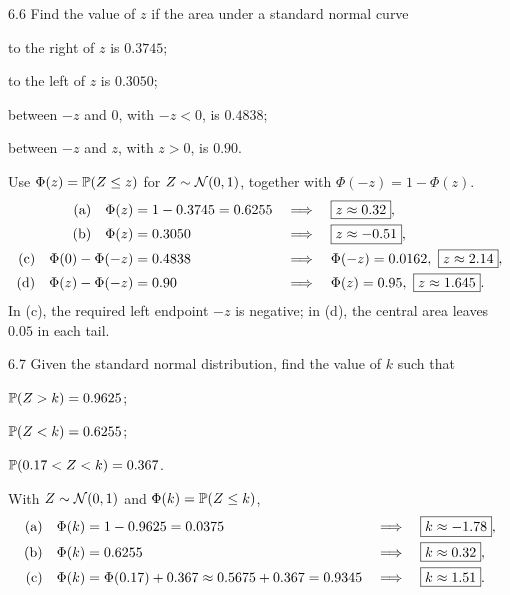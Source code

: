 \documentclass[11pt,oneside]{article}
\begin{document}
\begin{exercise}{6.6}
Find the value of $z$ if the area under a standard normal curve
\begin{exercisesubparts}
\item to the right of $z$ is $0.3745$;
\item to the left of $z$ is $0.3050$;
\item between $-z$ and $0$, with $-z<0$, is $0.4838$;
\item between $-z$ and $z$, with $z>0$, is $0.90$.
\end{exercisesubparts}
\end{exercise}
\begin{solution}
Use $\Phi(z)=\mathbb{P}(Z\le z)$ for $Z\sim\mathcal{N}(0,1)$, together with $\Phi(-z)=1-\Phi(z)$.
\begin{align*}
\textup{(a)}\quad\Phi(z)&=1-0.3745=0.6255
 &&\Longrightarrow\quad\boxed{z\approx0.32},\\
\textup{(b)}\quad\Phi(z)&=0.3050
 &&\Longrightarrow\quad\boxed{z\approx-0.51},\\
\textup{(c)}\quad\Phi(0)-\Phi(-z)&=0.4838
 &&\Longrightarrow\quad\Phi(-z)=0.0162,\ \boxed{z\approx2.14},\\
\textup{(d)}\quad\Phi(z)-\Phi(-z)&=0.90
 &&\Longrightarrow\quad\Phi(z)=0.95,\ \boxed{z\approx1.645}.
\end{align*}
In (c), the required left endpoint $-z$ is negative; in (d), the central area leaves $0.05$ in each tail.
\end{solution}

\begin{exercise}{6.7}
Given the standard normal distribution, find the value of $k$ such that
\begin{exercisesubparts}
\item $\mathbb{P}(Z>k)=0.9625$;
\item $\mathbb{P}(Z<k)=0.6255$;
\item $\mathbb{P}(0.17<Z<k)=0.367$.
\end{exercisesubparts}
\end{exercise}
\begin{solution}
With $Z\sim\mathcal{N}(0,1)$ and $\Phi(k)=\mathbb{P}(Z\le k)$,
\begin{align*}
\textup{(a)}\quad\Phi(k)&=1-0.9625=0.0375
 &&\Longrightarrow\quad\boxed{k\approx-1.78},\\
\textup{(b)}\quad\Phi(k)&=0.6255
 &&\Longrightarrow\quad\boxed{k\approx0.32},\\
\textup{(c)}\quad\Phi(k)&=\Phi(0.17)+0.367
 \approx0.5675+0.367=0.9345
 &&\Longrightarrow\quad\boxed{k\approx1.51}.
\end{align*}
\end{solution}
\end{document}

